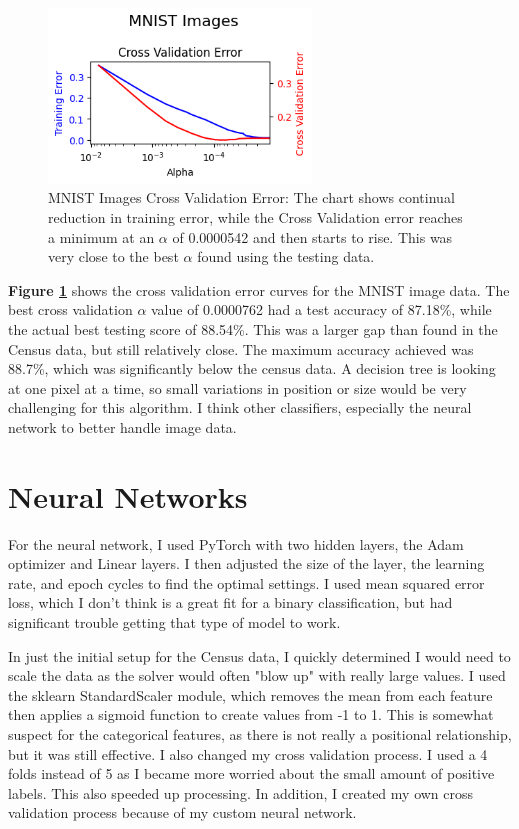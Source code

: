 \documentclass[letterpaper]{article} %
\begin{document}
\begin{figure}[h]
\centering
\includegraphics[width=2.75in]{figures/MNIST_Images_decision_tree_cross_validation.png}
\caption{MNIST Images Cross Validation Error:  The chart shows continual reduction in training error, while the Cross Validation error reaches a minimum at an $\alpha$ of 0.0000542 and then starts to rise.  This was very close to the best $\alpha$ found using the testing data. }
\label{fig:MNIST_Images_decision_tree_cross_validation}
\end{figure}

\textbf{Figure \ref{fig:MNIST_Images_decision_tree_cross_validation}}  shows the cross validation error curves for the MNIST image data.  The best cross validation $\alpha$ value of 0.0000762 had a test accuracy of 87.18\%,  while the actual best testing score of 88.54\%.  This was a larger gap than found in the Census data, but still relatively close. The maximum accuracy achieved was 88.7\%, which was significantly below the census data.  A decision tree is looking at one pixel at a time,  so small variations in position or size would be very challenging for this algorithm.  I think other classifiers, especially the neural network to better handle image data. 


\section{Neural Networks}
For the neural network, I used PyTorch with two hidden layers, the Adam optimizer and Linear layers.  I then adjusted the size of the layer, the learning rate, and epoch cycles to find the optimal settings.  I used mean squared error loss, which I don't think is a great fit for a binary classification, but had significant trouble getting that type of model to work.  

In just the initial setup for the Census data, I quickly determined I would need to scale the data as the solver would often "blow up" with really large values.  I used the sklearn StandardScaler module, which removes the mean from each feature then applies a sigmoid function to create values from -1 to 1.  This is somewhat suspect for the categorical features, as there is not really a positional relationship, but it was still effective.  I also changed my cross validation process.  I used a 4 folds instead of 5 as I became more worried about the small amount of positive labels.  This also speeded up processing.  In addition, I created my own cross validation process because of my custom neural network. 
\end{document}
